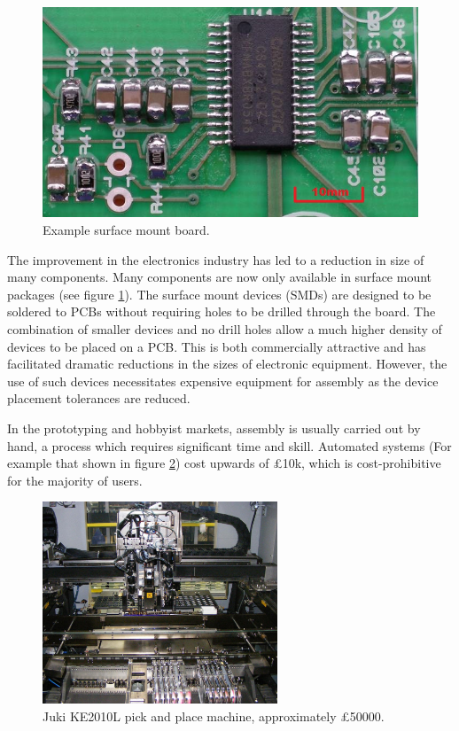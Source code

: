 \begin{figure}[ht!]
\centering
\includegraphics[width=120mm]{resources/smt_soldering.jpg}
\caption{Example surface mount board.}
\label{smdexample}
\end{figure}

The improvement in the electronics industry has led to a reduction in 
size of many components. Many components are now only available in
surface mount packages (see figure \ref{smdexample}). The surface mount 
devices (\gls{SMD}s) are designed to be soldered to \gls{PCB}s without
requiring holes to be drilled through the board. The combination of
smaller devices and no drill holes allow a much higher density of
devices to be placed on a PCB. This is both commercially
attractive and has facilitated dramatic reductions in the sizes of
electronic equipment. However, the use of such devices necessitates expensive 
equipment for assembly as the device placement tolerances are reduced.

In the prototyping and hobbyist markets, assembly is usually carried
out by hand, a process which requires significant time and skill. 
Automated systems (For example that shown in figure \ref{pickandplace}) cost upwards of \pounds 10k, which is cost-prohibitive
for the majority of users. 

\begin{figure}[ht!]
\centering
\includegraphics[width=70mm]{resources/pickandplace.jpg}
\caption{Juki KE2010L pick and place machine, approximately \pounds 50000.}
\label{pickandplace}
\end{figure}

